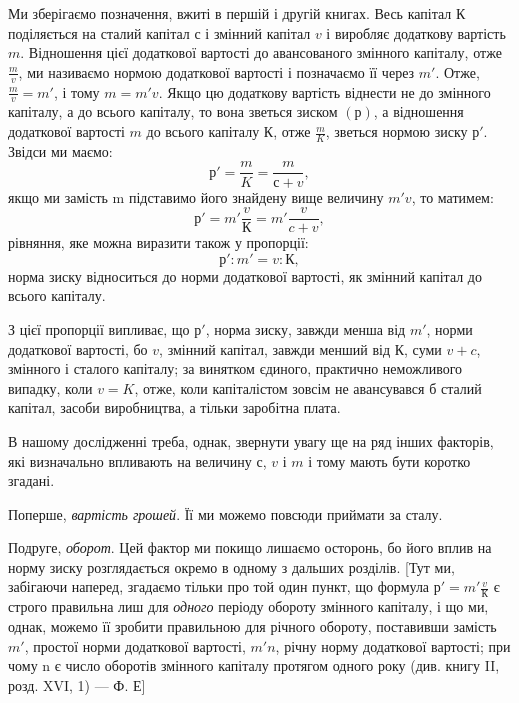 
Ми зберігаємо позначення, вжиті в першій і другій книгах.
Весь капітал $К$ поділяється на сталий капітал $с$ і змінний капітал
$v$ і виробляє додаткову вартість $m$. Відношення цієї додаткової
вартості до авансованого змінного капіталу, отже $\frac{m}{v}$, ми
називаємо нормою додаткової вартості і позначаємо її через $m'$.
Отже, $\frac{m}{v} = m'$, і тому $m = m'v$. Якщо цю додаткову вартість
віднести не до змінного капіталу, а до всього капіталу, то вона
зветься зиском $(р)$, а відношення додаткової вартості $m$ до
всього капіталу $К$, отже $\frac{m}{K}$, зветься нормою зиску $р'$. Звідси ми
маємо:\[
р' = \frac{m}{K} = \frac{m}{с + v},
\]
якщо ми замість m підставимо його знайдену вище величину
$m'v$, то матимем:\[
р' = m'\frac{v}{К} = m'\frac{v}{c + v},
\]
рівняння, яке можна виразити також у пропорції:\[
р':m' = v:К,
\]
норма зиску відноситься до норми додаткової вартості, як змінний
капітал до всього капіталу.

З цієї пропорції випливає, що $р'$, норма зиску, завжди менша
від $m'$, норми додаткової вартості, бо $v$, змінний капітал, завжди
менший від $К$, суми $v + c$, змінного і сталого капіталу; за винятком
єдиного, практично неможливого випадку, коли $v = K$, отже,
коли капіталістом зовсім не авансувався б сталий капітал, засоби
виробництва, а тільки заробітна плата.

В нашому дослідженні треба, однак, звернути увагу ще на
ряд інших факторів, які визначально впливають на величину $с$,
$v$ і $m$ і тому мають бути коротко згадані.

Поперше, \emph{вартість грошей}. Її ми можемо повсюди приймати
за сталу.

Подруге, \emph{оборот}. Цей фактор ми покищо лишаємо осторонь,
бо його вплив на норму зиску розглядається окремо в одному
з дальших розділів. [Тут ми, забігаючи наперед, згадаємо тільки
про той один пункт, що формула $р' = m'\frac{v}{К}$ є строго правильна
лиш для \emph{одного} періоду обороту змінного капіталу, і що ми,
однак, можемо її зробити правильною для річного обороту, поставивши
замість $m'$, простої норми додаткової вартості, $m'n$,
річну норму додаткової вартості; при чому n є число оборотів
змінного капіталу протягом одного року (див. книгу II, розд.
XVI, 1) — Ф. Е]
